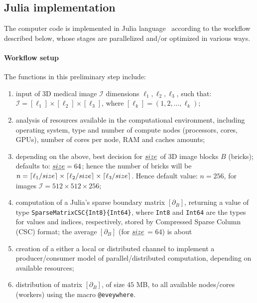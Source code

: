 

\subsection{Julia implementation}\label{sec:implementation}

The computer code is implemented in Julia language~\cite{} according to the workflow described below, whose stages are parallelized and/or optimized in various ways.

\paragraph{Workflow setup} The functions in this preliminary step include:
\begin{enumerate}

\item input of 3D medical image $\mathcal{I}$ dimensions $\ell_1, \ell_2, \ell_3$, such that: $\mathcal{I} = [\ell_1]\times[\ell_2]\times[\ell_3]$, where $[\ell_k] = (1,2,\ldots,\ell_k)$;

\item analysis of resources available in the computational environment, including operating system, type and number of compute nodes (processors, cores, GPUs), number of cores per node, RAM and caches amounts;

\item depending on the above, best decision for $\emph{size}$ of 3D image blocks $B$ (bricks); defaults to: $\emph{size}=64$; hence the number of bricks will be $n=\left\lceil \ell_1/size \right\rceil\times\left\lceil \ell_2/size \right\rceil\times\left\lceil \ell_3/size \right\rceil$. 
Hence default value: $n=256$, for images $\mathcal{I} = 512\times 512\times 256$;

\item computation of a Julia's sparse boundary matrix $[\partial_B]$, returning a value of type \texttt{SparseMatrixCSC\{Int8\}\{Int64\}}, where \texttt{Int8} and \texttt{Int64} are the types for values and indices, respectively, stored by Compressed Sparse Column (CSC) format; the average $[\partial_B]$ (for $\emph{size}$ = 64) is about

\item creation of a either a local or distributed channel to implement a producer/consumer model of parallel/distributed computation, depending on available resources;

\item distribution of matrix $[\partial_B]$, of size $45$ MB, to all available nodes/cores (workers) using the macro \texttt{@eveywhere}. 

\end{enumerate}


